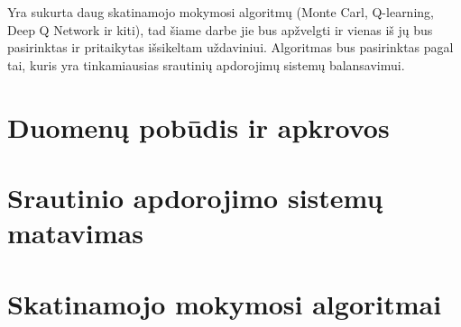 \documentclass{VUMIFPSbakalaurinis}
\begin{document}
Yra sukurta daug skatinamojo mokymosi algoritmų (Monte Carl, Q-learning, Deep Q Network ir kiti), tad šiame darbe jie bus apžvelgti ir vienas iš jų bus pasirinktas ir pritaikytas išsikeltam uždaviniui. Algoritmas bus pasirinktas pagal tai, kuris yra tinkamiausias srautinių apdorojimų sistemų balansavimui.

\section{Duomenų pobūdis ir apkrovos}

\section{Srautinio apdorojimo sistemų matavimas}

\section{Skatinamojo mokymosi algoritmai}

\printbibliography[heading=bibintoc] 
\end{document}
